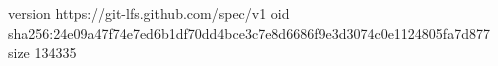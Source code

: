 version https://git-lfs.github.com/spec/v1
oid sha256:24e09a47f74e7ed6b1df70dd4bce3c7e8d6686f9e3d3074c0e1124805fa7d877
size 134335
